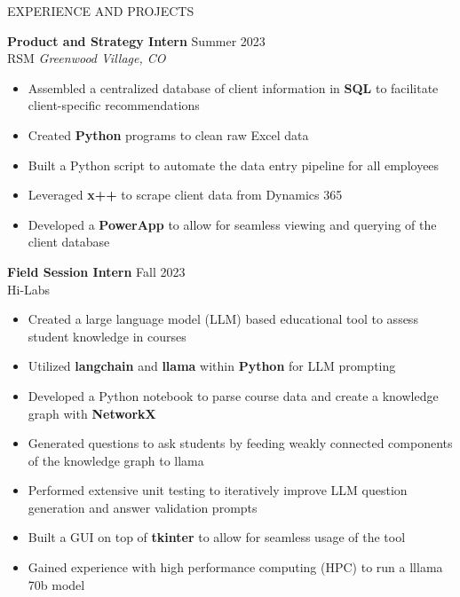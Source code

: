 \documentclass{resume} %
\begin{document}
\begin{rSection}{EXPERIENCE AND PROJECTS}

\textbf{Product and Strategy Intern} \hfill Summer 2023\\
RSM \hfill \textit{Greenwood Village, CO}
\vspace{-6pt}
 \begin{itemize}
    \itemsep -6pt {} 
     \item Assembled a centralized database of client information in \textbf{SQL} to facilitate client-specific recommendations 
     \item Created \textbf{Python} programs to clean raw Excel data
     \item Built a Python script to automate the data entry pipeline for all employees
     \item Leveraged \textbf{x++} to scrape client data from Dynamics 365
     \item Developed a \textbf{PowerApp} to allow for seamless viewing and querying of the client database
 \end{itemize}
 

\textbf{Field Session Intern} \hfill Fall 2023\\
Hi-Labs \hfill
\vspace{-6pt}
 \begin{itemize}
    \itemsep -6pt {} 
    \item Created a large language model (LLM) based educational tool to assess student knowledge in courses
    \item Utilized \textbf{langchain} and \textbf{llama} within \textbf{Python} for LLM prompting
    \item Developed a Python notebook to parse course data and create a knowledge graph with \textbf{NetworkX}
    \item Generated questions to ask students by feeding weakly connected components of the knowledge graph to llama
    \item Performed extensive unit testing to iteratively improve LLM question generation and answer validation prompts
    \item Built a GUI on top of \textbf{tkinter} to allow for seamless usage of the tool
    \item Gained experience with high performance computing (HPC) to run a lllama 70b model
 \end{itemize}
 

\end{rSection}
\end{document}
